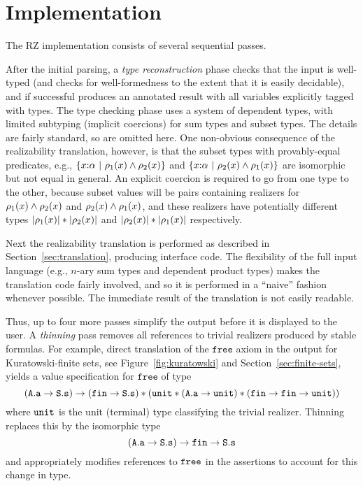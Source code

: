 \section{Implementation}
\label{sec:implementation}

The RZ implementation consists of several sequential passes.

After the initial parsing, a \emph{type reconstruction} phase checks
that the input is well-typed (and checks for well-formedness to the
extent that it is easily decidable), and if successful produces an
annotated result with all variables explicitly tagged with types. The
type checking phase uses a system of dependent types, with limited
subtyping (implicit coercions) for sum types and subset types. 
\iflong
The
details are fairly standard, so are omitted here. One non-obvious
consequence of the realizability translation, however, is that the
subset types with provably-equal predicates, e.g.,
$\{x{:}\alpha\ |\ \rho_1(x)\land \rho_2(x)\}$ and
$\{x{:}\alpha\ |\ \rho_2(x)\land \rho_1(x)\}$ are isomorphic
but not equal in general. An
explicit coercion is required to go from one type to the other,
because subset values will be pairs containing realizers for
$\rho_1(x)\land \rho_2(x)$ and
$\rho_2(x)\land \rho_1(x)$, and these realizers have
potentially different types $|\rho_1(x)| * |\rho_2(x)|$ and
$|\rho_2(x)| * |\rho_1(x)|$ respectively.
\fi %

Next the realizability translation is performed as described in
Section~\ref{sec:translation}, producing interface code. The
flexibility of the full input language (e.g., $n$-ary sum types and
dependent product types) makes the translation code fairly involved,
and so it is performed in a ``naive'' fashion whenever possible. The
immediate result of the translation is not easily readable.
 
Thus, up to four more passes simplify the output before it is displayed to
the user. A \emph{thinning} pass removes all references to trivial
realizers produced by stable formulas.
\iflong
For example, direct translation
of the $\mathtt{free}$ axiom in the output for Kuratowski-finite sets,
see Figure~\ref{fig:kuratowski} and Section~\ref{sec:finite-sets},
yields a value specification for $\mathtt{free}$ of type
%
\begin{equation*}
  (\mathtt{A.a} \to \mathtt{S.s}) \to 
  (\mathtt{fin} \to \mathtt{S.s}) * (\mathtt{unit} * (\mathtt{A.a} \to
  \mathtt{unit}) *
  (\mathtt{fin} \to \mathtt{fin} \to \mathtt{unit}))
\end{equation*}
%
where $\mathtt{unit}$ is the unit (terminal) type classifying the trivial
realizer. Thinning replaces this by the isomorphic type
%
\begin{equation*}
  (\mathtt{A.a} \to \mathtt{S.s}) \to \mathtt{fin} \to \mathtt{S.s}
\end{equation*}
%
and appropriately modifies references to $\mathtt{free}$ in the assertions to account for this change in type.

